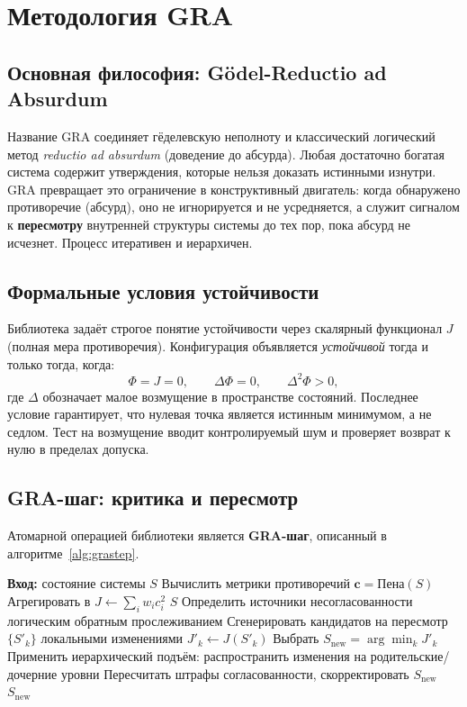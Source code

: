 \documentclass[11pt,a4paper]{article}
\begin{document}
\section{Методология GRA}
\subsection{Основная философия: Gödel-Reductio ad Absurdum}
Название GRA соединяет гёделевскую неполноту и классический логический метод \textit{reductio ad absurdum} (доведение до абсурда). Любая достаточно богатая система содержит утверждения, которые нельзя доказать истинными изнутри. GRA превращает это ограничение в конструктивный двигатель: когда обнаружено противоречие (абсурд), оно не игнорируется и не усредняется, а служит сигналом к \textbf{пересмотру} внутренней структуры системы до тех пор, пока абсурд не исчезнет. Процесс итеративен и иерархичен.

\subsection{Формальные условия устойчивости}
Библиотека задаёт строгое понятие устойчивости через скалярный функционал $J$ (полная мера противоречия). Конфигурация объявляется \textit{устойчивой} тогда и только тогда, когда:
\begin{equation}
\Phi = J = 0, \qquad \Delta\Phi = 0, \qquad \Delta^2\Phi > 0,
\end{equation}
где $\Delta$ обозначает малое возмущение в пространстве состояний. Последнее условие гарантирует, что нулевая точка является истинным минимумом, а не седлом. Тест на возмущение вводит контролируемый шум и проверяет возврат к нулю в пределах допуска.

\subsection{GRA-шаг: критика и пересмотр}
Атомарной операцией библиотеки является \textbf{GRA-шаг}, описанный в алгоритме~\ref{alg:grastep}.

\begin{algorithm}[tb]
\caption{GRA-шаг (одна итерация)}\label{alg:grastep}
\begin{algorithmic}[1]
\State \textbf{Вход:} состояние системы $S$
\State Вычислить метрики противоречий $\mathbf{c} = \text{Пена}(S)$
\State Агрегировать в $J \leftarrow \sum_i w_i c_i^2$ 
    \State \Return $S$ 
\EndIf
\State Определить источники несогласованности логическим обратным прослеживанием
\State Сгенерировать кандидатов на пересмотр $\{S'_k\}$ локальными изменениями
    \State $J'_k \leftarrow J(S'_k)$
\EndFor
\State Выбрать $S_{\text{new}} = \arg\min_k J'_k$
\State Применить иерархический подъём: распространить изменения на родительские/дочерние уровни
\State Пересчитать штрафы согласованности, скорректировать $S_{\text{new}}$
\State \Return $S_{\text{new}}$
\end{algorithmic}
\end{algorithm}
\end{document}

